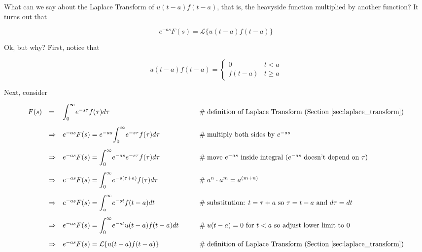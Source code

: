 \documentclass{article}
\theoremstyle{definition}
\begin{document}
\bigskip
\noindent
What can we say about the Laplace Transform of $u(t-a)f(t-a)$, that is, the heavyside function multiplied by another function? It turns out that

\bigskip
\begin{equation*}
e^{-as} F(s) = \mathcal{L}\{u(t-a) f(t-a)\}
\label{eqn:lt_uf}
\end{equation*}


\bigskip
\noindent
Ok, but why? First, notice that

\bigskip
\begin{equation*}
u(t-a)f(t-a) =  
           \begin{cases} 
               0        & t < a  \\
               f(t-a)  & t \geq a
           \end{cases}
\end{equation*}

\bigskip
\noindent
Next, consider


\begin{equation*}
\begin{array}{lllll}
F(s)
&=& \mathlarger{\int}_0^\infty e^{-s\tau} f(\tau) d\tau                                                       &\qquad \mathrel{\#} \text{definition of Laplace Transform (Section \ref{sec:laplace_transform})}    \\
[15pt]
&\Rightarrow& e^{-as} F(s) = e^{-as} \mathlarger{\int}_0^\infty e^{-s\tau} f(\tau) d\tau    &\qquad \mathrel{\#} \text{multiply both sides by $e^{-as}$}                                                              \\
[15pt]
&\Rightarrow& e^{-as} F(s) = \mathlarger{\int}_0^\infty e^{-as} e^{-s\tau} f(\tau) d\tau    &\qquad \mathrel{\#} \text{move $e^{-as}$ inside integral ($e^{-as}$ doesn't depend on $\tau$)}    \\
[15pt]
&\Rightarrow& e^{-as} F(s) = \mathlarger{\int}_0^\infty e^{-s(\tau+a)} f(\tau) d\tau         &\qquad \mathrel{\#} a^n \cdot a^m = a^{(m+n)}                                                                                 \\
[15pt]
&\Rightarrow& e^{-as} F(s) = \mathlarger{\int}_a^\infty e^{-st} f(t-a) dt                           &\qquad \mathrel{\#} \text{substitution: $t = \tau + a$ so $\tau = t - a$ and $d\tau = dt$}                   \\
[15pt]
&\Rightarrow& e^{-as} F(s) = \mathlarger{\int}_0^\infty e^{-st} u(t-a) f(t-a) dt                 &\qquad \mathrel{\#} \text{$u(t-a) = 0$ for $t < a$ so adjust lower limit to 0}                                       \\
[15pt]
&\Rightarrow& e^{-as} F(s) = \mathcal{L}\{u(t-a) f(t-a)\}                                                 &\qquad \mathrel{\#} \text{definition of Laplace Transform (Section \ref{sec:laplace_transform})}       \\
\end{array}
\end{equation*}
\end{document}
